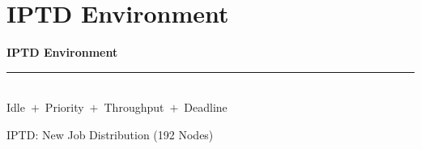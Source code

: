 
\section{IPTD Environment}

\begin{frame}[plain]
  \vfill
  \begin{center}
    {\Huge\bfseries\color{DeepBlue} IPTD Environment}\\[0.6em]
    {\color{SkyBlue}\rule{0.40\linewidth}{1.4pt}}\\[0.7em]
    {\large\color{DeepBlue!80!black} Idle \,$+$\, Priority \,$+$\, Throughput \,$+$\, Deadline}
  \end{center}
  \vfill
\end{frame}

\begin{frame}{IPTD: New Job Distribution (192 Nodes)}
  \centering

\end{frame}

